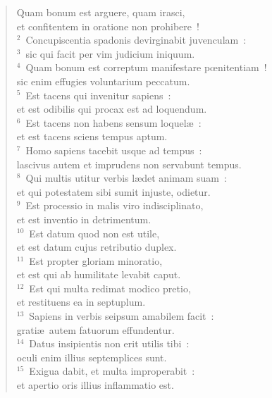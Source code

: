 \begin{flushleft}\begin{verse}\vspace{-19pt}\hspace{6pt}Quam bonum est arguere, quam irasci,\\\hspace{6pt} et confitentem in oratione non prohibere~!\\
${}^{2}$~Concupiscentia spadonis devirginabit juvenculam~:\\
${}^{3}$~sic qui facit per vim judicium iniquum.\\
${}^{4}$~Quam bonum est correptum manifestare pœnitentiam~!\\ sic enim effugies voluntarium peccatum.\\
${}^{5}$~Est tacens qui invenitur sapiens~:\\ et est odibilis qui procax est ad loquendum.\\
${}^{6}$~Est tacens non habens sensum loquel\ae~:\\ et est tacens sciens tempus aptum.\\
${}^{7}$~Homo sapiens tacebit usque ad tempus~:\\ lascivus autem et imprudens non servabunt tempus.\\
${}^{8}$~Qui multis utitur verbis l\ae det animam suam~:\\ et qui potestatem sibi sumit injuste, odietur.\\
${}^{9}$~Est processio in malis viro indisciplinato,\\ et est inventio in detrimentum.\\
${}^{10}$~Est datum quod non est utile,\\ et est datum cujus retributio duplex.\\
${}^{11}$~Est propter gloriam minoratio,\\ et est qui ab humilitate levabit caput.\\
${}^{12}$~Est qui multa redimat modico pretio,\\ et restituens ea in septuplum.\\
${}^{13}$~Sapiens in verbis seipsum amabilem facit~:\\ grati\ae\ autem fatuorum effundentur.\\
${}^{14}$~Datus insipientis non erit utilis tibi~:\\ oculi enim illius septemplices sunt.\\
${}^{15}$~Exigua dabit, et multa improperabit~:\\ et apertio oris illius inflammatio est.\\

\end{verse}
\end{flushleft}
